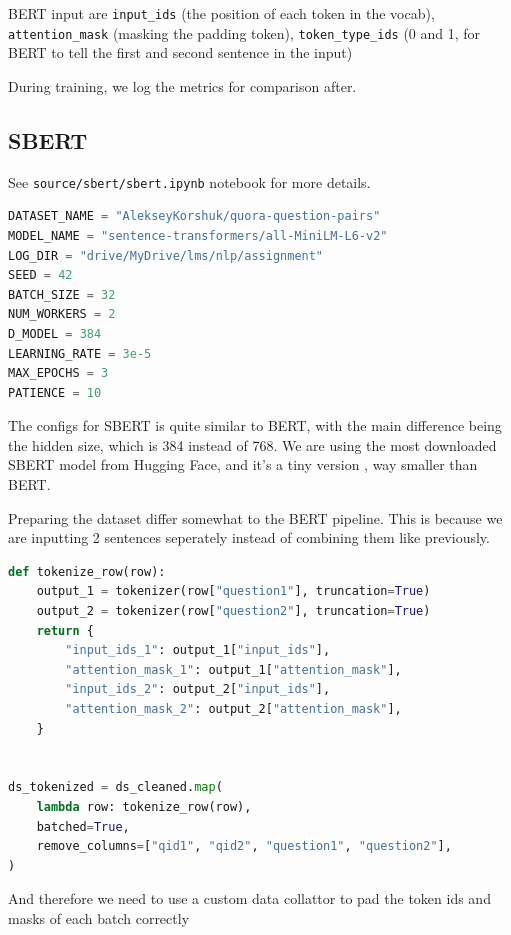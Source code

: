 BERT input are \texttt{input\_ids} (the position of each token in the vocab), \texttt{attention\_mask} (masking the padding token), \texttt{token\_type\_ids} (0 and 1, for BERT to tell the first and second sentence in the input) 

During training, we log the metrics for comparison after.



\subsection{SBERT}

See \texttt{source/sbert/sbert.ipynb} notebook for more details.

\begin{lstlisting}[language=python, caption={SBERT config and hyperparams}]
DATASET_NAME = "AlekseyKorshuk/quora-question-pairs"
MODEL_NAME = "sentence-transformers/all-MiniLM-L6-v2"
LOG_DIR = "drive/MyDrive/lms/nlp/assignment"
SEED = 42
BATCH_SIZE = 32
NUM_WORKERS = 2
D_MODEL = 384
LEARNING_RATE = 3e-5
MAX_EPOCHS = 3
PATIENCE = 10
\end{lstlisting}

The configs for SBERT is quite similar to BERT, with the main difference being the hidden size, which is 384 instead of 768. We are using the most downloaded SBERT model from Hugging Face, and it's a tiny version \cite{allminilm-l6-v2}, way smaller than BERT.

Preparing the dataset differ somewhat to the BERT pipeline. This is because we are inputting 2 sentences seperately instead of combining them like previously.

\begin{lstlisting}[language=python, caption={Preprocess data}]
def tokenize_row(row):
    output_1 = tokenizer(row["question1"], truncation=True)
    output_2 = tokenizer(row["question2"], truncation=True)
    return {
        "input_ids_1": output_1["input_ids"],
        "attention_mask_1": output_1["attention_mask"],
        "input_ids_2": output_2["input_ids"],
        "attention_mask_2": output_2["attention_mask"],
    }


ds_tokenized = ds_cleaned.map(
    lambda row: tokenize_row(row),
    batched=True,
    remove_columns=["qid1", "qid2", "question1", "question2"],
)
\end{lstlisting}

And therefore we need to use a custom data collattor to pad the token ids and masks of each batch correctly

